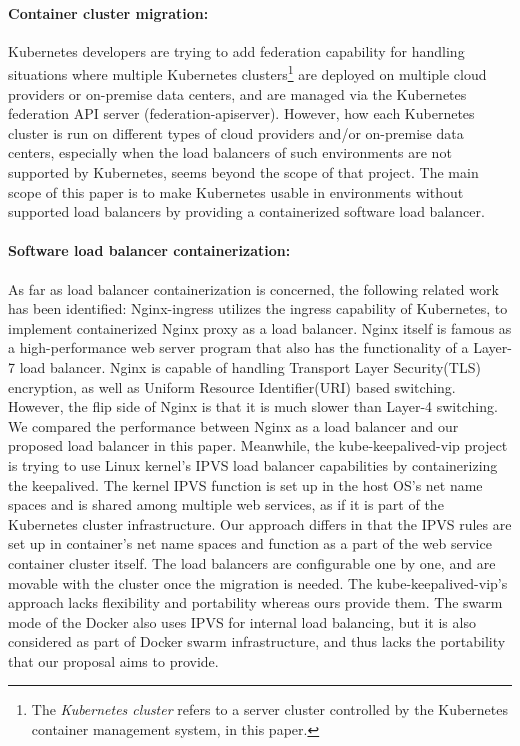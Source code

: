 \paragraph{\bf Container cluster migration:}

Kubernetes developers are trying to add federation\cite{K8sFederation2017} capability for handling situations 
where multiple Kubernetes clusters\footnote{The {\em Kubernetes cluster} refers to a server cluster 
controlled by the Kubernetes container management system, in this paper.} 
are deployed on multiple cloud providers or on-premise data centers, 
and are managed via the Kubernetes federation API server (federation-apiserver). 
However, how each Kubernetes cluster is run on different types of cloud providers
and/or on-premise data centers, especially when the load balancers of such environments are not supported by Kubernetes, 
seems beyond the scope of that project. 
The main scope of this paper is to make Kubernetes usable in environments 
without supported load balancers by providing a containerized software load balancer.

\paragraph{\bf Software load balancer containerization:}
As far as load balancer containerization is concerned, the following related work has been identified:
Nginx-ingress\cite{Pleshakov2016,NginxInc2016} utilizes the ingress\cite{K8sIngress2017} capability of Kubernetes, 
to implement containerized Nginx proxy as a load balancer. Nginx itself is famous as a high-performance web server program
that also has the functionality of a Layer-7 load balancer. Nginx is capable of handling Transport Layer Security(TLS) encryption, 
as well as Uniform Resource Identifier(URI) based switching. However, the flip side of Nginx is that it is much slower than Layer-4 switching.
We compared the performance between Nginx as a load balancer and our proposed load balancer in this paper.
%
Meanwhile, the kube-keepalived-vip\cite{Prashanth2016} project is trying to use Linux kernel's IPVS\cite{Zhang2000} 
load balancer capabilities by containerizing the keepalived\cite{ACassen2016}.
The kernel IPVS function is set up in the host OS's net name spaces and is shared among multiple web services,
as if it is part of the Kubernetes cluster infrastructure.
Our approach differs in that the IPVS rules are set up in container's net name spaces 
and function as a part of the web service container cluster itself.
The load balancers are configurable one by one, and are  movable with the cluster once the migration is needed.
The kube-keepalived-vip's approach lacks flexibility and portability whereas ours provide them.
%
The swarm mode of the Docker\cite{DockerCoreEngineering2016,DockerInc2017} also uses IPVS for internal load balancing,
but it is also considered as part of Docker swarm infrastructure, 
and thus lacks the portability that our proposal aims to provide.

